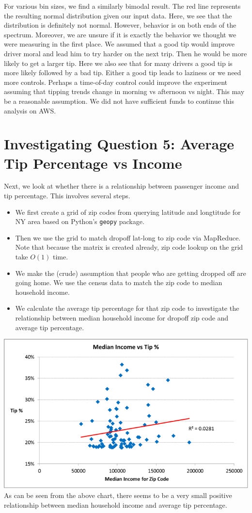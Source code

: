 \documentclass[twoside]{article}
\begin{document}
\begin{multicols}{2}
For various bin sizes, we find a similarly bimodal result. The red line represents the resulting normal distribution given our input data. Here, we see that the distribution is definitely not normal. However, behavior is on both ends of the spectrum. Moreover, we are unsure if it is exactly the behavior we thought we were measuring in the first place. We assumed that a good tip would improve driver moral and lead him to try harder on the next trip.  Then he would be more likely to get a larger tip.  Here we also see that for many drivers a good tip is more likely followed by a bad tip.  Either a good tip leads to laziness or we need more controls. Perhaps a time-of-day control could improve the experiment assuming that tipping trends change in morning vs afternoon vs night. This may be a reasonable assumption. We did not have sufficient funds to continue this analysis on AWS. 

\section{Investigating Question 5: Average Tip Percentage vs Income}
Next, we look at whether there is a relationship between passenger income and tip percentage. This involves several steps.
\begin{itemize}
\item We first create a grid of zip codes from querying latitude and longtitude for NY area based on Python's \texttt{geopy} package.
\item Then we use the grid to match dropoff lat-long to zip code via MapReduce. Note that because the matrix is created already, zip code lookup on the grid take $O(1)$ time.
\item We make the (crude) assumption that people who are getting dropped off are going home. We use the census data to match the zip code to median household income.
\item We calculate the average tip percentage for that zip code to investigate the relationship between median household income for dropoff zip code and average tip percentage.
\end{itemize}

\includegraphics[scale=.4]{zip_income.png}
As can be seen from the above chart, there seems to be a very small positive relationship between median household income and average tip percentage.


\end{multicols}
\end{document}
